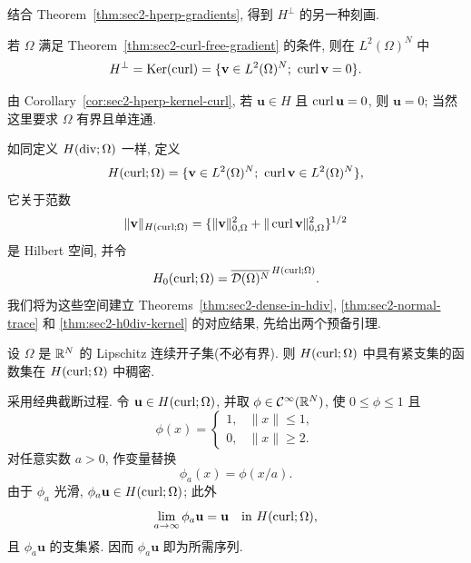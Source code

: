 结合 Theorem~\ref{thm:sec2-hperp-gradients}, 得到 $H^\perp$ 的另一种刻画.

\setcounter{statement}{8}
\begin{Corollary}\label{cor:sec2-hperp-kernel-curl}
若 $\Omega$ 满足 Theorem~\ref{thm:sec2-curl-free-gradient} 的条件, 则在
$L^2(\Omega)^N$ 中
\[
  H^\perp=\operatorname{Ker}(\operatorname{curl})
  =\{\mathbf v\in L^2(\Omega)^N;\ \operatorname{curl}\mathbf v=0\}.
\]
\end{Corollary}

\setcounter{statement}{1}
\begin{Remark}\label{rem:sec2-h-curlzero}
由 Corollary~\ref{cor:sec2-hperp-kernel-curl}, 若 $\mathbf u\in H$ 且
$\operatorname{curl}\mathbf u=0$, 则 $\mathbf u=0$; 当然这里要求 $\Omega$ 有界且单连通.
\end{Remark}

如同定义 $H(\operatorname{div};\Omega)$ 一样, 定义
\[
  H(\operatorname{curl};\Omega)=\{\mathbf v\in L^2(\Omega)^N;
  \ \operatorname{curl}\mathbf v\in L^2(\Omega)^N\},
\]
它关于范数
\[
  \|\mathbf v\|_{H(\operatorname{curl};\Omega)}
  =\{\|\mathbf v\|_{0,\Omega}^2+\|\operatorname{curl}\mathbf v\|_{0,\Omega}^2\}^{1/2}
\]
是 Hilbert 空间, 并令
\[
  H_0(\operatorname{curl};\Omega)=\overline{\mathcal{D}(\Omega)^N}^{\,H(\operatorname{curl};\Omega)}.
\]
我们将为这些空间建立 Theorems~\ref{thm:sec2-dense-in-hdiv},
\ref{thm:sec2-normal-trace} 和 \ref{thm:sec2-h0div-kernel} 的对应结果, 先给出两个预备引理.

\setcounter{statement}{2}
\begin{Lemma}\label{lem:sec2-compact-support-dense-hcurl}
设 $\Omega$ 是 $\mathbb{R}^N$ 的 Lipschitz 连续开子集(不必有界). 则
$H(\operatorname{curl};\Omega)$ 中具有紧支集的函数集在 $H(\operatorname{curl};\Omega)$ 中稠密.
\end{Lemma}
\begin{Proof}
采用经典截断过程. 令 $\mathbf u\in H(\operatorname{curl};\Omega)$, 并取
$\phi\in\mathcal C^\infty(\mathbb{R}^N)$, 使 $0\le\phi\le1$ 且
\[
  \phi(x)=\begin{cases}
  1,&\|x\|\le1,\\
  0,&\|x\|\ge2.
  \end{cases}
\]
对任意实数 $a>0$, 作变量替换
\[
  \phi_a(x)=\phi(x/a).
\]
由于 $\phi_a$ 光滑, $\phi_a\mathbf u\in H(\operatorname{curl};\Omega)$; 此外
\[
  \lim_{a\to\infty}\phi_a\mathbf u=\mathbf u
  \quad\text{in }H(\operatorname{curl};\Omega),
\]
且 $\phi_a\mathbf u$ 的支集紧. 因而 $\phi_a\mathbf u$ 即为所需序列.
\end{Proof}

